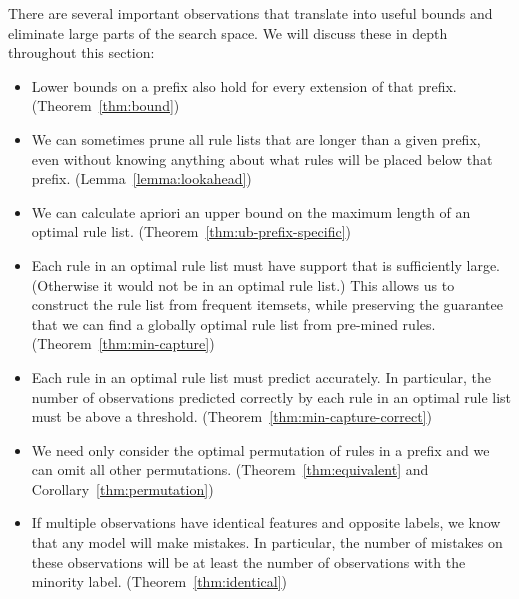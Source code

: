 There are several important observations that translate into useful bounds
and eliminate large parts of the search space.
%
We will discuss these in depth throughout this section:
%
\begin{itemize}
\item Lower bounds on a prefix also hold for every extension of that prefix.
(Theorem~\ref{thm:bound})

\item We can sometimes prune all rule lists that are longer than a given prefix,
even without knowing anything about what rules will be placed below that prefix.
(Lemma~\ref{lemma:lookahead})

\item We can calculate apriori an upper bound on the maximum length
of an optimal rule list. (Theorem~\ref{thm:ub-prefix-specific})

\item Each rule in an optimal rule list must have support that is
sufficiently large. (Otherwise it would not be in an optimal rule list.)
%
This allows us to construct the rule list from frequent itemsets,
while preserving the guarantee that we can find a globally optimal
rule list from pre-mined rules. (Theorem~\ref{thm:min-capture})

\item Each rule in an optimal rule list must predict accurately.
%
In particular, the number of observations predicted correctly
by each rule in an optimal rule list must be above a threshold.
(Theorem~\ref{thm:min-capture-correct})

\item We need only consider the optimal permutation of rules
in a prefix and we can omit all other permutations.
(Theorem~\ref{thm:equivalent} and Corollary~\ref{thm:permutation})

\item  If multiple observations have identical features and opposite labels,
we know that any model will make mistakes.
%
In particular, the number of mistakes on these observations will be at least
the number of observations with the minority label. (Theorem~\ref{thm:identical})
\end{itemize}
